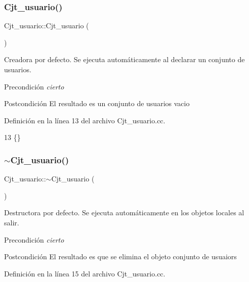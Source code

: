\subsubsection{\texorpdfstring{Cjt\+\_\+usuario()}{Cjt\_usuario()}}
{\footnotesize\ttfamily Cjt\+\_\+usuario\+::\+Cjt\+\_\+usuario (\begin{DoxyParamCaption}{ }\end{DoxyParamCaption})}



Creadora por defecto. Se ejecuta automáticamente al declarar un conjunto de usuarios. 

\begin{DoxyPrecond}{Precondición}
{\itshape cierto} 
\end{DoxyPrecond}
\begin{DoxyPostcond}{Postcondición}
El resultado es un conjunto de usuarios vacio 
\end{DoxyPostcond}


Definición en la línea 13 del archivo Cjt\+\_\+usuario.\+cc.


\begin{DoxyCode}
13 \{\}
\end{DoxyCode}
\mbox{\label{class_cjt__usuario_a5ce2decc4b973b8c687ef991b376bed2}} 
\subsubsection{\texorpdfstring{$\sim$\+Cjt\+\_\+usuario()}{~Cjt\_usuario()}}
{\footnotesize\ttfamily Cjt\+\_\+usuario\+::$\sim$\+Cjt\+\_\+usuario (\begin{DoxyParamCaption}{ }\end{DoxyParamCaption})}



Destructora por defecto. Se ejecuta automáticamente en los objetos locales al salir. 

\begin{DoxyPrecond}{Precondición}
{\itshape cierto} 
\end{DoxyPrecond}
\begin{DoxyPostcond}{Postcondición}
El resultado es que se elimina el objeto conjunto de usuaiors 
\end{DoxyPostcond}


Definición en la línea 15 del archivo Cjt\+\_\+usuario.\+cc.


